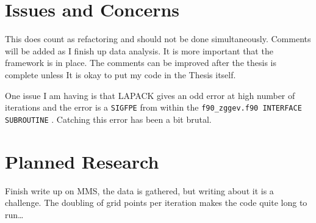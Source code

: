 \documentclass[a4paper]{article}
\begin{document}
\section{Issues and Concerns}
This does count as refactoring and should not be done simultaneously. Comments will
be added as I finish up data analysis. It is more important that the framework is in
place. The comments can be improved after the thesis is complete unless It is okay 
to put my code in the Thesis itself.

One issue I am having is that LAPACK gives an odd error at high number of iterations
and the error is a \verb|SIGFPE| from within the \verb|f90_zggev.f90 INTERFACE SUBROUTINE| .
Catching this error has been a bit brutal.

\section{Planned Research}
Finish write up on MMS, the data is gathered, but writing about it is a challenge. The doubling of 
grid points per iteration makes the code quite long to run\dots
\end{document}
